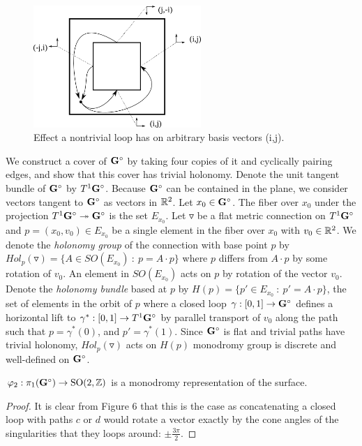 \documentclass[]{article}
\begin{document}
\begin{figure}[H]
\centering
\includegraphics[width=2.5in]{monodromy.png}
\caption{Effect a nontrivial loop has on arbitrary basis vectors (i,j).}
\label{fig:loop}
\end{figure}

We construct a cover of $\mathbf{G}^\circ$ by taking four copies of it and cyclically pairing edges, and show that this cover has trivial holonomy. Denote the unit tangent bundle of $\mathbf{G}^\circ$ by $T^1\mathbf{G}^\circ$. Because $\mathbf{G}^\circ$ can be contained in the plane, we consider vectors tangent to $\mathbf{G}^\circ$ as vectors in $\mathbb{R}^2$. Let $x_0\in\mathbf{G}^\circ$. The fiber over $x_0$ under the projection $T^1\mathbf{G}^\circ\twoheadrightarrow\mathbf{G}^\circ$ is the set $E_{x_0}$. Let $\triangledown$ be a flat metric connection on $T^1\mathbf{G}^\circ$ and $p=(x_0,v_0)\in E_{x_0}$ be a single element in the fiber over $x_0$ with $v_0\in\mathbb{R}^2$. We denote the \emph{holonomy group} of the connection with base point $p$ by $Hol_p(\triangledown)=\{A\in SO(E_{x_0})~:~ p = A\cdot p\}$ where $p$ differs from $A\cdot p$ by some rotation of $v_0$. An element in $SO(E_{x_0})$ acts on $p$ by rotation of the vector $v_0$. Denote the \emph{holonomy bundle} based at $p$ by $H(p)=\{p'\in E_{x_0}~:~ p'= A\cdot p \}$, the set of elements in the orbit of $p$ where a closed loop $\gamma:[0,1]\rightarrow\mathbf{G}^\circ$ defines a horizontal lift to $\gamma^*:[0,1]\rightarrow T^1\mathbf{G}^\circ$ by parallel transport of $v_0$ along the path such that $p=\gamma^*(0)$, and $p'=\gamma^*(1)$. Since $\mathbf{G}^\circ$ is flat and trivial paths have trivial holonomy, $Hol_p(\triangledown)$ acts on $H(p)$ monodromy group is discrete and well-defined on $\mathbf{G}^\circ$.

\begin{lem}
$\varphi_2:\pi_1(\mathbf{G}^\circ)\rightarrow \mathrm{SO}(2,\mathbb{Z})$ is a monodromy representation of the surface.
\begin{proof}
It is clear from Figure 6 that this is the case as concatenating a closed loop with paths $c$ or $d$ would rotate a vector exactly by the cone angles of the singularities that they loops around: $\pm \frac{3\pi}{2}$.
\end{proof}
\end{lem}
\end{document}
